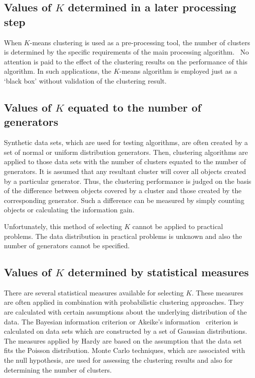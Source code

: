 \subsection{Values of $K$ determined in a later processing step}
When $K$-means clustering is used as a pre-processing
tool,  the  number  of  clusters  is  determined  by  the
specific requirements of the main processing algorithm.~\cite{hansen96}
No  attention  is  paid  to  the  effect  of
the  clustering  results  on  the  performance  of  this
algorithm. In such applications, the $K$-means
algorithm  is  employed  just  as  a  `black  box'  without
validation of the clustering result.

\subsection{Values of $K$ equated to the number of generators}
Synthetic   data   sets,   which   are   used   for   testing
algorithms,  are  often  created  by  a  set  of  normal  or
uniform   distribution   generators.   Then,   clustering
algorithms  are  applied  to  those  data  sets  with  the
number of clusters equated to the number of generators.
It  is  assumed  that  any  resultant  cluster  will
cover  all  objects  created  by  a  particular  generator.
Thus,  the  clustering  performance  is  judged  on  the
basis  of  the  difference  between  objects  covered  by
a  cluster  and  those  created  by  the  corresponding
generator.  Such  a  difference  can  be  measured  by
simply   counting   objects   or   calculating   the
information gain.~\cite{bradly98}

Unfortunately,  this  method  of  selecting $K$ cannot
be  applied  to  practical  problems.  The  data  distribution
in  practical  problems  is  unknown  and  also
the number of generators cannot be specified.

\subsection{Values of $K$ determined by statistical measures}
There  are  several  statistical  measures  available  for
selecting $K$. These measures are often applied in combination
with   probabilistic   clustering   approaches.
They are calculated with certain assumptions
about  the  underlying  distribution  of  the  data.  The
Bayesian   information   criterion   or   Akeike’s   information~\cite{ishioka00}
criterion  is  calculated  on  data  sets
which  are  constructed  by  a  set  of  Gaussian  distributions.
The  measures  applied  by  Hardy  are
based  on  the  assumption  that  the  data  set  fits  the
Poisson distribution. Monte Carlo techniques,
which  are  associated  with  the null  hypothesis,  are
used for assessing the clustering results and also for
determining the number of clusters.

